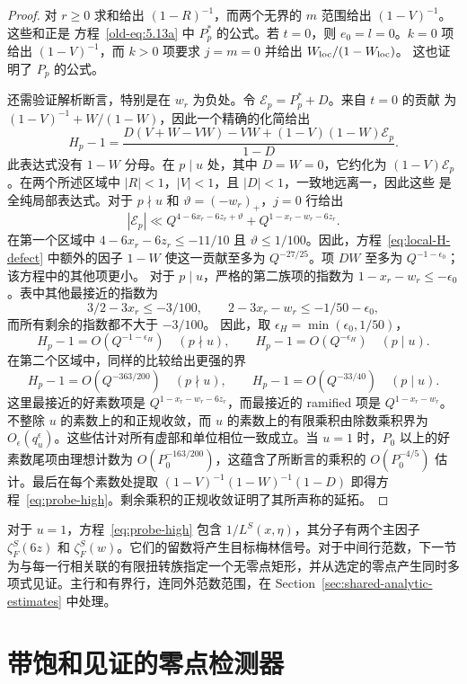 \documentclass[11pt,a4paper]{article}
\numberwithin{equation}{section}
\numberwithin{figure}{section}
\theoremstyle{definition}
\theoremstyle{remark}
\begin{document}
\begin{proof}
对 $r\ge0$ 求和给出 $(1-R)^{-1}$，而两个无界的 $m$
范围给出 $(1-V)^{-1}$。这些和正是
方程~\eqref{old-eq:5.13a} 中 $P_p^*$ 的公式。若 $t=0$，则
$e_0=l=0$。$k=0$ 项给出 $(1-V)^{-1}$，而 $k>0$
项要求 $j=m=0$ 并给出 $W_{\rm loc}/(1-W_{\rm loc})$。
这也证明了
$P_p$ 的公式。

还需验证解析断言，特别是在
$w_r$ 为负处。令 $\mathcal E_p=P_p^*+D$。来自 $t=0$ 的贡献
为 $(1-V)^{-1}+W/(1-W)$，因此一个精确的化简给出
\begin{equation}\label{eq:local-H-defect}
 H_p-1=
 \frac{D(V+W-VW)-VW+(1-V)(1-W)\mathcal E_p}{1-D}.
\end{equation}
此表达式没有 $1-W$ 分母。在 $p\mid u$ 处，其中
$D=W=0$，它约化为 $(1-V)\mathcal E_p$。在两个所述区域中
$|R|<1$，$|V|<1$，且 $|D|<1$，一致地远离一，因此这些
是全纯局部表达式。对于 $p\nmid u$ 和 $\vartheta=(-w_r)_+$，$j=0$ 行给出
\[
 |\mathcal E_p|\ll
 Q^{4-6x_r-6z_r+\vartheta}+Q^{1-x_r-w_r-6z_r}.
\]
在第一个区域中 $4-6x_r-6z_r\le-11/10$ 且
$\vartheta\le1/100$。因此，方程~\eqref{eq:local-H-defect} 中额外的因子 $1-W$
使这一贡献至多为 $Q^{-27/25}$。项 $DW$ 至多为
$Q^{-1-\epsilon_0}$；该方程中的其他项更小。
对于 $p\mid u$，严格的第二族项的指数为
$1-x_r-w_r\le-\epsilon_0$。表中其他最接近的指数为
\[
 3/2-3x_r\le-3/100,\qquad
 2-3x_r-w_r\le-1/50-\epsilon_0,
\]
而所有剩余的指数都不大于 $-3/100$。
因此，取 $\epsilon_H=\min(\epsilon_0,1/50)$，
\[
 H_p-1=O(Q^{-1-\epsilon_H})\quad(p\nmid u),\qquad
 H_p-1=O(Q^{-\epsilon_H})\quad(p\mid u).
\]
在第二个区域中，同样的比较给出更强的界
\[
 H_p-1=O(Q^{-363/200})\quad(p\nmid u),\qquad
 H_p-1=O(Q^{-33/40})\quad(p\mid u).
\]
这里最接近的好素数项是
$Q^{1-x_r-w_r-6z_r}$，而最接近的 ramified 项是
$Q^{1-x_r-w_r}$。不整除 $u$ 的素数上的和正规收敛，而 $u$ 的素数上的有限乘积由除数乘积界为 $O_\epsilon(q_u^\epsilon)$。这些估计对所有虚部和单位相位一致成立。当 $u=1$ 时，$P_0$ 以上的好素数尾项由理想计数为 $O(P_0^{-163/200})$，这蕴含了所断言的乘积的 $O(P_0^{-4/5})$ 估计。最后在每个素数处提取 $(1-V)^{-1}(1-W)^{-1}(1-D)$ 即得方程~\eqref{eq:probe-high}。剩余乘积的正规收敛证明了其所声称的延拓。
\end{proof}

对于 $u=1$，方程~\eqref{eq:probe-high} 包含 $1/L^S(x,\eta)$，其分子有两个主因子 $\zeta_F^S(6z)$ 和 $\zeta_F^S(w)$。它们的留数将产生目标梅林信号。对于中间行范数，下一节为与每一行相关联的有限扭转族指定一个无零点矩形，并从选定的零点产生同时多项式见证。主行和有界行，连同外范数范围，在 Section~\ref{sec:shared-analytic-estimates} 中处理。

\section{带饱和见证的零点检测器}\label{sec:detector}
\end{document}

